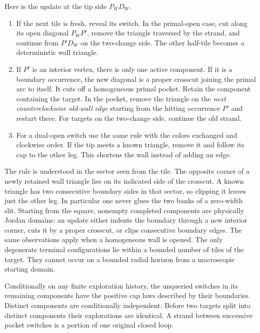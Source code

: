 Here is the update at the tip side $P_WD_W$.
\begin{enumerate}[label=\textup{(\roman*)}]
\item If the next tile is fresh, reveal its switch.  In the primal-open
case, cut along its open diagonal $P_WP'$, remove the triangle traversed
by the strand, and continue from $P'D_W$ on the two-change side.  The
other half-tile becomes a deterministic wall triangle.
\item If $P'$ is an interior vertex, there is only one active component.
If it is a boundary occurrence, the new diagonal is a proper crosscut
joining the primal arc to itself.  It cuts off a homogeneous primal
pocket.  Retain the component containing the target.  In the pocket,
remove the triangle on the \emph{next counterclockwise old-wall edge}
starting from the hitting occurrence $P'$ and restart there.  For targets
on the two-change side, continue the old strand.
\item For a dual-open switch use the same rule with the colors exchanged
and clockwise order.  If the tip meets a known triangle, remove it and
follow its cap to the other leg.  This shortens the wall instead of
adding an edge.
\end{enumerate}
The rule is understood in the sector seen from the tile.  The opposite
corner of a newly retained wall triangle lies on its indicated side of
the crosscut.  A known triangle has two consecutive boundary sides in
that sector, so clipping it leaves just the other leg.  In particular
one never glues the two banks of a zero-width slit.  Starting from the
square, nonempty completed components are physically Jordan domains:
an update either indents the boundary through a new interior corner,
cuts it by a proper crosscut, or clips consecutive boundary edges.
The same observations apply when a homogeneous wall is opened.  The
only degenerate terminal configurations lie within a bounded number of
tiles of the target.  They cannot occur on a bounded radial horizon
from a macroscopic starting domain.

\begin{lemma}\label{peel:factorization}
Conditionally on any finite exploration history, the unqueried switches
in its remaining components have the positive cap laws described by
their boundaries.  Distinct components are conditionally independent.
Before two targets split into distinct components their explorations
are identical.  A strand between successive pocket switches is a
portion of one original closed loop.
\end{lemma}

